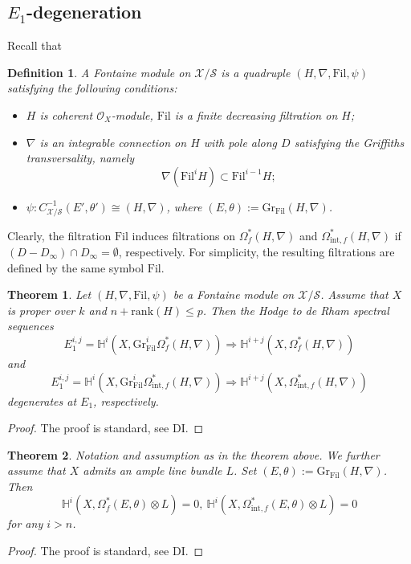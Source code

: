 \documentclass[12pt, a4paper]{article}
\newtheorem{definition}{Definition}[section]
\newtheorem{theorem}{Theorem}[section]
\begin{document}
\subsection{$E_1$-degeneration}
 Recall that
\begin{definition}
A Fontaine module on $\mathcal X/\mathcal S$ is a quadruple $(H,\nabla,\mathrm{Fil},\psi)$ satisfying the following conditions:
\begin{itemize}
\item $H$ is coherent $\mathcal O_X$-module, $\mathrm{Fil}$ is a finite decreasing filtration on $H$;
\item $\nabla$ is an integrable connection on $H$ with pole along $D$ satisfying the Griffiths transversality, namely
$$
\nabla(\mathrm{Fil}^iH)\subset\mathrm{Fil}^{i-1}H;
$$
\item $\psi:C^{-1}_{\mathcal X/\mathcal S}(E',\theta')\cong(H,\nabla)$, where $(E,\theta):=\mathrm{Gr}_\mathrm{Fil}(H,\nabla)$.
\end{itemize}
\end{definition}
Clearly, the filtration $\mathrm{Fil}$ induces filtrations on $\Omega_f^*(H,\nabla)$ and $\Omega^*_{\mathrm{int},f}(H,\nabla)$ if $(D-D_\infty)\cap D_\infty=\emptyset$, respectively. For simplicity, the resulting filtrations are defined by the same symbol $\mathrm{Fil}$.
\begin{theorem}\label{E_1 MF}
 Let $(H,\nabla,\mathrm{Fil},\psi)$ be a Fontaine module on $\mathcal X/\mathcal S$. Assume that  $X$ is proper over $k$ and $n+\mathrm{rank}(H)\leq p$.
Then the Hodge to de Rham spectral sequences
$$
E_1^{i,j}=\mathbb H^i(X,\mathrm{Gr}^i_\mathrm{Fil}\Omega^*_f(H,\nabla))\Rightarrow \mathbb H^{i+j}(X,\Omega^*_f(H,\nabla))
$$
and
$$
E_1^{i,j}=\mathbb H^i(X,\mathrm{Gr}^i_\mathrm{Fil}\Omega^*_{\mathrm{int},f}(H,\nabla))\Rightarrow \mathbb H^{i+j}(X,\Omega^*_{\mathrm{int},f}(H,\nabla))
$$
degenerates at $E_1$, respectively.
\end{theorem}
\begin{proof}
The proof is standard, see DI.
\end{proof}
\begin{theorem}\label{vanishing f}
Notation and assumption as in the theorem above. We further assume that $X$ admits an ample line bundle $L$. Set $(E,\theta):=\mathrm{Gr}_\mathrm{Fil}(H,\nabla)$. Then 
$$
\mathbb H^i(X,\Omega_f^*(E,\theta)\otimes L)=0,~
\mathbb H^i(X,\Omega_{\mathrm{int},f}^*(E,\theta)\otimes L)=0
$$
for any $i>n$.
\end{theorem}
\begin{proof}
The proof is standard, see DI.
\end{proof}
\end{document}
